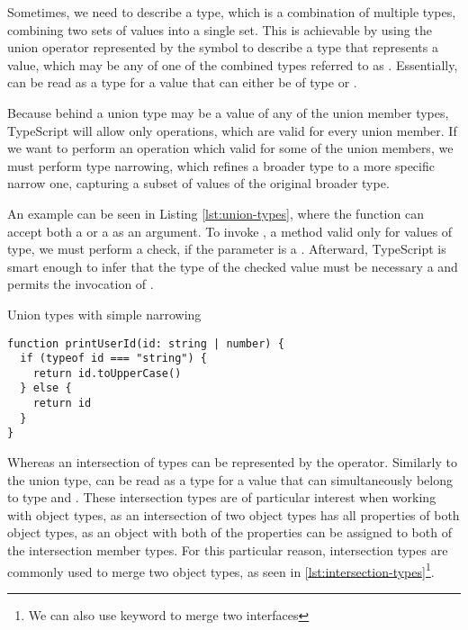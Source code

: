 Sometimes, we need to describe a type, which is a combination of multiple types, combining two sets of values into a single set. This is achievable by using the union operator represented by the \code{|} symbol to describe a type that represents a value, which may be any of one of the combined types referred to as  \cite{DocumentationEverydayTypes}. Essentially,  can be read as a type for a value that can either be of type  or .

Because behind a union type may be a value of any of the union member types, TypeScript will allow only operations, which are valid for every union member. If we want to perform an operation which valid for some of the union members, we must perform type narrowing, which refines a broader type to a more specific narrow one, capturing a subset of values of the original broader type.

An example can be seen in Listing \ref{lst:union-types}, where the function  can accept both a  or a  as an argument. To invoke , a method valid only for values of  type, we must perform a check, if the parameter is a . Afterward, TypeScript is smart enough to infer that the type of the checked value must be necessary a  and permits the invocation of .

\begin{listing}[ht]
  \caption{Union types with simple narrowing}\label{lst:union-types}
  \begin{verbatim}
function printUserId(id: string | number) {
  if (typeof id === "string") {
    return id.toUpperCase()
  } else {
    return id
  }
}
  \end{verbatim}
\end{listing}

Whereas an intersection of types can be represented by the \code{\&} operator. Similarly to the union type,  can be read as a type for a value that can simultaneously belong to type  and . These intersection types are of particular interest when working with object types, as an intersection of two object types has all properties of both object types, as an object with both of the properties can be assigned to both of the intersection member types. For this particular reason, intersection types are commonly used to merge two object types, as seen in \ref{lst:intersection-types}\footnote{We can also use  keyword to merge two interfaces}.

